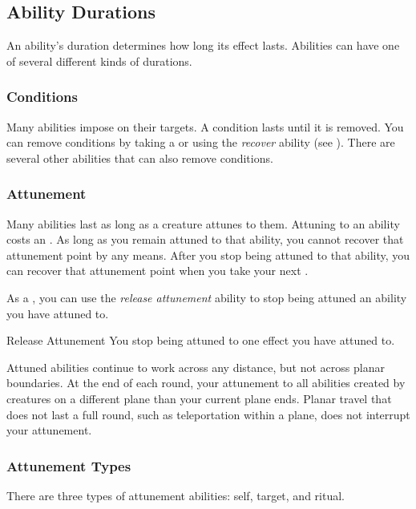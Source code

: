     \subsection{Ability Durations}

        An ability's duration determines how long its effect lasts.
        Abilities can have one of several different kinds of durations.

        \subsubsection{Conditions}\label{Conditions}
            Many abilities impose  on their targets.
            A condition lasts until it is removed.
            You can remove conditions by taking a  or using the \textit{recover} ability (see ).
            There are several other abilities that can also remove conditions.

        \subsubsection{Attunement}\label{Attunement}
            Many abilities last as long as a creature attunes to them.
            Attuning to an ability costs an .
            As long as you remain attuned to that ability, you cannot recover that attunement point by any means.
            After you stop being attuned to that ability, you can recover that attunement point when you take your next .

            As a , you can use the \textit{release attunement} ability to stop being attuned an ability you have attuned to.
            \begin{freeability}{Release Attunement}
                You stop being attuned to one effect you have attuned to.
            \end{freeability}

            Attuned abilities continue to work across any distance, but not across planar boundaries.
            At the end of each round, your attunement to all abilities created by creatures on a different plane than your current plane ends.
            Planar travel that does not last a full round, such as teleportation within a plane, does not interrupt your attunement.

            \subsubsection{Attunement Types}\label{Attunement Types}
                There are three types of attunement abilities: self, target, and ritual.

